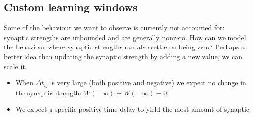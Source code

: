 \subsection{Custom learning windows}
Some of the behaviour we want to observe is currently not accounted for: synaptic strengths are unbounded and are generally nonzero. How can we model the behaviour where synaptic strengths can also settle on being zero? Perhaps a better idea than updating the synaptic strength by adding a new value, we can scale it. 
\begin{itemize}
\item When $\Delta t_{ij}$ is very large (both positive and negative) we expect no change in the synaptic strength: $W(-\infty) = W(-\infty) = 0$. 
\item We expect a specific positive time delay to yield the most amount of synaptic 
\end{itemize}




\small{}

\label{LastPage}~


